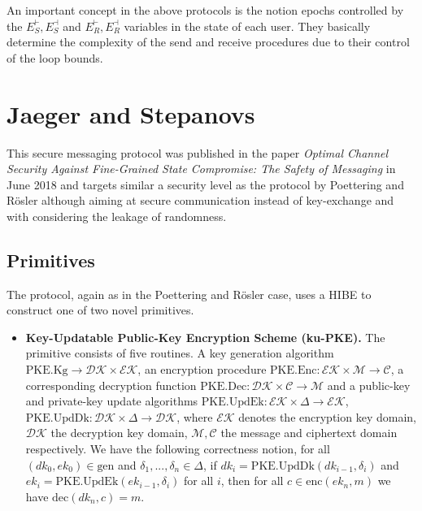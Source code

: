 \documentclass[11pt,a4paper,twoside,openright,bibliography=totoc]{scrbook}
\renewcommand{\t}{\text} %
\begin{document}
An important concept in the above protocols is the notion epochs
controlled by the $E_S^\vdash,E_S^\dashv$ and $E_R^\vdash,E_R^\dashv$
variables in the state of each user. They basically determine
the complexity of the send and receive procedures due to their
control of the loop bounds.


\section[Jaeger and Stepanovs]{Jaeger and Stepanovs~\cite{jaeger2018optimal}}
\label{sec:jaeger-stepanovs}

This secure messaging protocol was published in the paper
\textit{Optimal Channel Security Against Fine-Grained State Compromise: The Safety of Messaging}
in June 2018 and targets similar a security level as the protocol by
Poettering and Rösler although aiming at secure communication instead
of key-exchange and with considering the leakage of randomness.

\subsection{Primitives}
\label{sec:primitives-1}

The protocol, again as in the Poettering and Rösler case, uses a HIBE to construct
one of two novel primitives.
\begin{itemize}
\item \textbf{Key-Updatable Public-Key Encryption Scheme (ku-PKE).} The primitive
  consists of five routines. A key generation algorithm
  $\t{PKE.Kg} \rightarrow \mathcal{DK} \times \mathcal{EK}$, an encryption
  procedure $\t{PKE.Enc}: \mathcal{EK} \times \mathcal{M} \rightarrow \mathcal{C}$,
  a corresponding decryption function
  $\t{PKE.Dec}: \mathcal{DK} \times \mathcal{C} \rightarrow \mathcal{M}$ and
  a public-key and private-key update algorithms
  $\t{PKE.UpdEk}: \mathcal{EK} \times \Delta \rightarrow \mathcal{EK}$,
  $\t{PKE.UpdDk}: \mathcal{DK} \times \Delta \rightarrow \mathcal{DK}$, where
  $\mathcal{EK}$ denotes the encryption key domain, $\mathcal{DK}$ the
  decryption key domain, $\mathcal{M}, \mathcal{C}$ the message and
  ciphertext domain respectively. We have the following correctness notion, for all
  $(dk_0, ek_0) \in \t{gen}$ and $\delta_1,...,\delta_n \in \Delta$, if
  $dk_i = \t{PKE.UpdDk}(dk_{i-1},\delta_i)$ and
  $ek_i = \t{PKE.UpdEk}(ek_{i-1},\delta_i)$ for all $i$, then for all
  $c \in \t{enc}(ek_n,m)$ we have $\t{dec}(dk_n,c)=m$.
\end{itemize}
\end{document}
